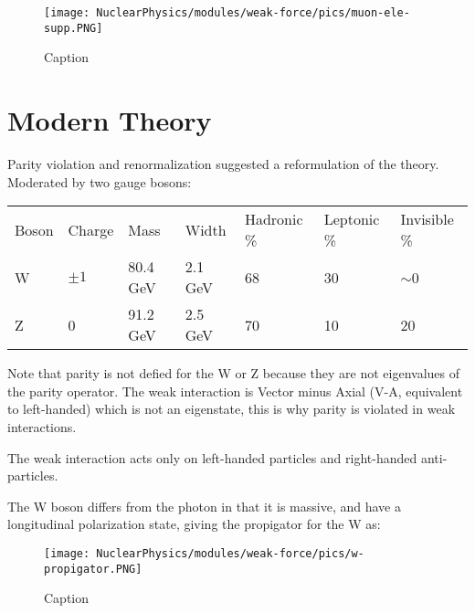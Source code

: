             \begin{figure}[H]
                \centering
                \texttt{[image: NuclearPhysics/modules/weak-force/pics/muon-ele-supp.PNG]}
            \caption{Caption}
            \end{figure}
            
        
        
    \section{Modern Theory}
        Parity violation and renormalization suggested a reformulation of the theory. 
        Moderated by two gauge bosons:
               
               
               
            \begin{table}[H]
                \centering
                    \begin{tabular}{lllllll}
                        Boson   &   Charge    &   Mass    &   Width     &   Hadronic \%     &   Leptonic \%     &   Invisible \% \\
                        W       &  $\pm1$ &     80.4 GeV  &  2.1 GeV     &  68       &      30      &   $\sim$0      \\
                        Z       &   0 &         91.2 GeV    &   2.5 GeV    &    70     &     10  &      20 \\
                    \end{tabular}
            \end{table}
            
            Note that parity is not defied for the W or Z because they are not eigenvalues of the parity operator. The weak interaction is Vector minus Axial (V-A, equivalent to left-handed) which is not an eigenstate, this is why parity is violated in weak interactions. 
            
            The weak interaction acts only on left-handed particles and right-handed anti-particles. 
            
            The W boson differs from the photon in that it is massive, and have a longitudinal polarization state, giving the propigator for the W as:
            
            \begin{figure}[H]
                \centering
                \texttt{[image: NuclearPhysics/modules/weak-force/pics/w-propigator.PNG]}
            \caption{Caption}
            \end{figure}
            
